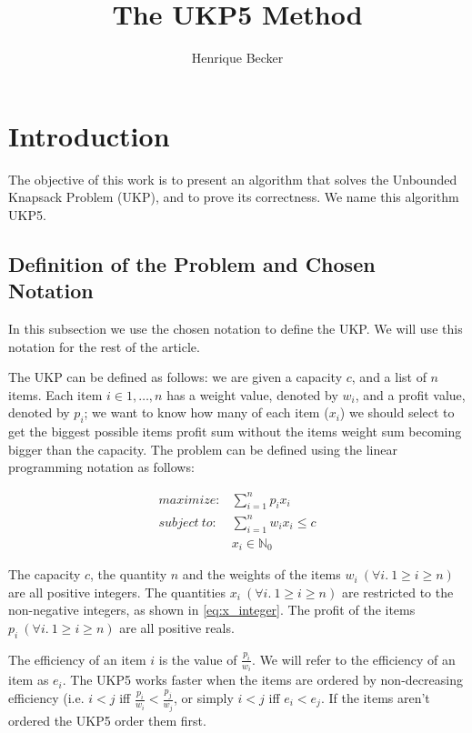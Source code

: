\documentclass[12pt]{article}
\title{The UKP5 Method}
\author{Henrique Becker\inst{1}}
\begin{document}
 

\maketitle

\section{Introduction}

The objective of this work is to present an algorithm that solves the Unbounded Knapsack Problem (UKP), and to prove its correctness. We name this algorithm UKP5.

\subsection{Definition of the Problem and Chosen Notation}

In this subsection we use the chosen notation to define the UKP. We will use this notation for the rest of the article.

The UKP can be defined as follows: we are given a capacity \(c\), and a list of \(n\) items. Each item \(i \in {1, \ldots, n}\) has a weight value, denoted by \(w_i\), and a profit value, denoted by \(p_i\); we want to know how many of each item (\(x_i\)) we should select to get the biggest possible items profit sum without the items weight sum becoming bigger than the capacity. The problem can be defined using the linear programming notation as follows:

\begin{align}
  maximize: &\sum_{i=1}^n p_i x_i\label{eq:objfun}\\
subject~to: &\sum_{i=1}^n w_i x_i \leq c\label{eq:capcons}\\
            &x_i \in \mathbb{N}_0\label{eq:x_integer}
\end{align}

The capacity \(c\), the quantity \(n\) and the weights of the items \(w_i~(\forall i.~1 \geq i \geq n)\) are all positive integers. The quantities \(x_i~(\forall i.~1 \geq i \geq n)\) are restricted to the non-negative integers, as shown in \eqref{eq:x_integer}. The profit of the items \(p_i~(\forall i.~1 \geq i \geq n)\) are all positive reals.

The efficiency of an item \(i\) is the value of \(\frac{p_i}{w_i}\). We will refer to the efficiency of an item as \(e_i\). The UKP5 works faster when the items are ordered by non-decreasing efficiency (i.e. \(i < j\) iff \(\frac{p_i}{w_i} < \frac{p_j}{w_j}\), or simply \(i < j\) iff \(e_i < e_j\). If the items aren't ordered the UKP5 order them first.
\end{document}
